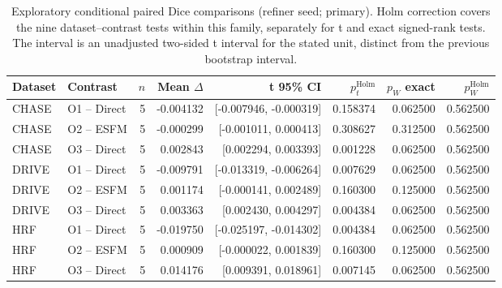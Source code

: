 \begin{table}[p]
\caption{Exploratory conditional paired Dice comparisons (refiner seed; primary). Holm correction covers the nine dataset--contrast tests within this family, separately for t and exact signed-rank tests. The interval is an unadjusted two-sided t interval for the stated unit, distinct from the previous bootstrap interval.}\label{tab:completion-refiner_seed-primary}
\centering\scriptsize\setlength{\tabcolsep}{3pt}
\begin{tabular}{llrrrrrr}
\toprule
Dataset & Contrast & $n$ & Mean $\Delta$ & t 95\% CI & $p_t^{\mathrm{Holm}}$ & $p_W$ exact & $p_W^{\mathrm{Holm}}$ \\
\midrule
CHASE & O1 -- Direct & 5 & -0.004132 & [-0.007946, -0.000319] & 0.158374 & 0.062500 & 0.562500 \\
CHASE & O2 -- ESFM & 5 & -0.000299 & [-0.001011, 0.000413] & 0.308627 & 0.312500 & 0.562500 \\
CHASE & O3 -- Direct & 5 & 0.002843 & [0.002294, 0.003393] & 0.001228 & 0.062500 & 0.562500 \\
DRIVE & O1 -- Direct & 5 & -0.009791 & [-0.013319, -0.006264] & 0.007629 & 0.062500 & 0.562500 \\
DRIVE & O2 -- ESFM & 5 & 0.001174 & [-0.000141, 0.002489] & 0.160300 & 0.125000 & 0.562500 \\
DRIVE & O3 -- Direct & 5 & 0.003363 & [0.002430, 0.004297] & 0.004384 & 0.062500 & 0.562500 \\
HRF & O1 -- Direct & 5 & -0.019750 & [-0.025197, -0.014302] & 0.004384 & 0.062500 & 0.562500 \\
HRF & O2 -- ESFM & 5 & 0.000909 & [-0.000022, 0.001839] & 0.160300 & 0.125000 & 0.562500 \\
HRF & O3 -- Direct & 5 & 0.014176 & [0.009391, 0.018961] & 0.007145 & 0.062500 & 0.562500 \\
\bottomrule
\end{tabular}
\end{table}

